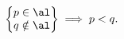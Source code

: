 \begin{lem}
	\label{1.19:lem1}
	\[ \left\{
		\begin{matrix}
			p \in \al    \\
			q \notin \al
		\end{matrix}
		\right\}\implies p < q.\]
\end{lem}

